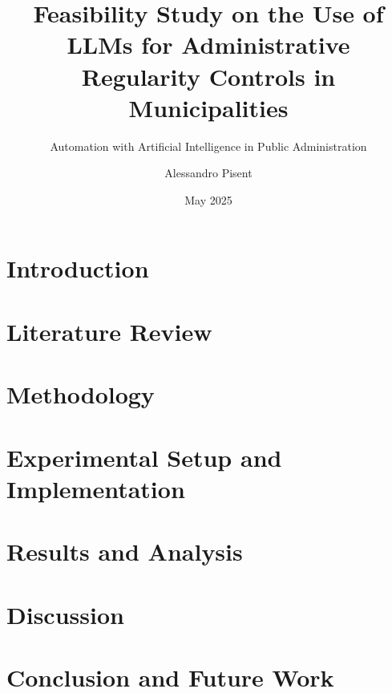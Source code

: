 \documentclass[a4paper,english,noexaminfo]{sapthesis}
\title{Feasibility Study on the Use of LLMs for Administrative Regularity Controls in Municipalities}
\subtitle{Automation with Artificial Intelligence in Public Administration}
\author{Alessandro Pisent}
\date{May 2025}
\begin{document}
\maketitle
\frontmatter


\tableofcontents
\mainmatter




\chapter{Introduction}

 

\chapter{Literature Review}


\chapter{Methodology}


\chapter{Experimental Setup and Implementation}
 

\chapter{Results and Analysis}


\chapter{Discussion}


\chapter{Conclusion and Future Work}





\end{document}

